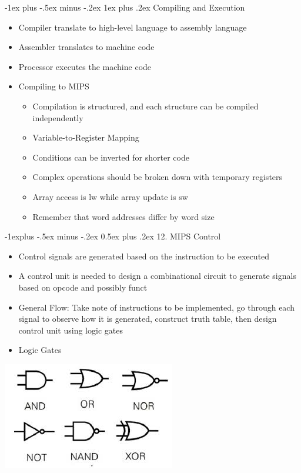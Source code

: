 \documentclass[10pt, portrait]{article}
\makeatletter
\renewcommand{\section}{\@startsection{section}{1}{0mm}%
                                {-1ex plus -.5ex minus -.2ex}%
                                {0.5ex plus .2ex}%
                                {\normalfont\large\bfseries}}
\renewcommand{\section}{\@startsection{section}{2}{0mm}%
                                {-1explus -.5ex minus -.2ex}%
                                {0.5ex plus .2ex}%
                                {\normalfont\normalsize\bfseries}}
\renewcommand{\subsection}{\@startsection{subsection}{3}{0mm}%
                                {-1ex plus -.5ex minus -.2ex}%
                                {1ex plus .2ex}%
                                {\normalfont\small\bfseries}}%
\makeatother
\begin{document}
\begin{multicols*}{2}
\subsection{Compiling and Execution}
\begin{itemize}
    \item Compiler translate to high-level language to assembly language
    \item Assembler translates to machine code
    \item Processor executes the machine code
    \item Compiling to MIPS
    \begin{itemize}
        \item Compilation is structured, and each structure can be compiled independently
        \item Variable-to-Register Mapping
        \item Conditions can be inverted for shorter code
        \item Complex operations should be broken down with temporary registers
        \item Array access is lw while array update is sw
        \item Remember that word addresses differ by word size
    \end{itemize}
\end{itemize}

\section{12. MIPS Control}
\begin{itemize}
    \item Control signals are generated based on the instruction to be executed
    \item A control unit is needed to design a combinational circuit to generate signals based on opcode and possibly funct
    \item General Flow: Take note of instructions to be implemented, go through each signal to observe how it is generated, construct truth table, then design control unit using logic gates
    \item Logic Gates
\end{itemize}
\begin{center}
    \includegraphics[width=0.5\linewidth]{gates.jpg}
\end{center}


\end{multicols*}
\end{document}
